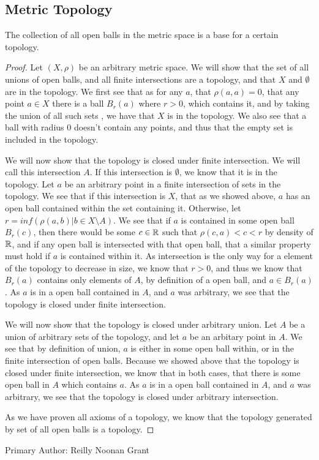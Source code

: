 \subsection{Metric Topology}

\begin{majorEx}%
    The collection of all open balls in the metric space is a base for a certain
    topology.
\end{majorEx}

\begin{proof}
 Let $(X,\rho)$ be an arbitrary
 metric space. We will show that the set of all unions of open balls, and all
  finite intersections are a topology, and that $X$ and $\emptyset$
  are in the topology. We first see that as for any $a$, that $\rho(a,a)=0$,
  that any point $a\in X$ there is a ball $B_r(a)$ where $r>0$, 
  which contains it, and by taking the union of all such sets , we
  have that $X$ is in the topology.
  We also see that a ball with radius $0$ doesn't contain any points,
  and thus that the empty set is included in the topology. 

  We will now show that the topology is closed under finite
  intersection. We will call this intersection $A$. If this
  intersection is $\emptyset$, we know that it 
  is in the topology. Let $a$ be an arbitrary point in a finite intersection
  of sets in the topology. We see that if this intersection is $X$,
  that as we showed above, $a$ has an open ball contained within the
  set containing it. Otherwise, let $r= inf (\rho(a,b)| b \in X
  \setminus A)$. We see that if $a$ is contained in some open ball
  $B_r(c)$, then there would  be some $c\in \mathbb{R}$ such that
  $\rho(c,a)<c<r$ by density of $\mathbb{R}$, 
  and if any open ball is intersected with that open ball, that a
  similar property must hold if $a$ is contained within it. As
  intersection is the only way for a element of the topology to
  decrease in size, we know that $r>0$, and thus we know that $B_r(a)$
  contains only elements of $A$, by definition of a open ball, and
  $a\in B_r(a)$. As $a$ is in a open ball contained in $A$, and $a$ was arbitrary, we
  see that the topology is closed under finite intersection.

  We will now show that the topology is closed under arbitrary
  union. Let $A$ be a union of arbitrary sets of the topology, and let
  $a$ be an arbitary point in $A$. We see that by definition of union,
  $a$ is either in some open ball within, or in the finite intersection of
  open balls. Because we showed above that the topology is closed
  under finite intersection, we know that in both cases, that there is
  some open ball in $A$ which contains $a$. As $a$ is in a open ball 
  contained in $A$, and $a$ was arbitrary, we see that the topology is
  closed under arbitrary intersection.
  
  As we have proven all axioms of a topology, we know that the
  topology generated by set of all open balls is a topology.
\end{proof}
Primary Author: Reilly Noonan Grant

